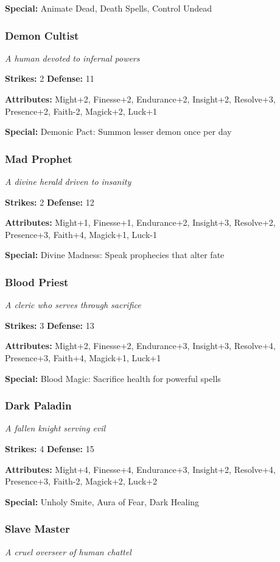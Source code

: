 \documentclass[10pt,twoside]{article}
\begin{document}
\textbf{Special:} Animate Dead, Death Spells, Control Undead

\subsubsection{Demon Cultist}
\textit{A human devoted to infernal powers}

\textbf{Strikes:} 2 \quad \textbf{Defense:} 11

\textbf{Attributes:} Might+2, Finesse+2, Endurance+2, Insight+2, Resolve+3, Presence+2, Faith-2, Magick+2, Luck+1

\textbf{Special:} Demonic Pact: Summon lesser demon once per day

\subsubsection{Mad Prophet}
\textit{A divine herald driven to insanity}

\textbf{Strikes:} 2 \quad \textbf{Defense:} 12

\textbf{Attributes:} Might+1, Finesse+1, Endurance+2, Insight+3, Resolve+2, Presence+3, Faith+4, Magick+1, Luck-1

\textbf{Special:} Divine Madness: Speak prophecies that alter fate

\subsubsection{Blood Priest}
\textit{A cleric who serves through sacrifice}

\textbf{Strikes:} 3 \quad \textbf{Defense:} 13

\textbf{Attributes:} Might+2, Finesse+2, Endurance+3, Insight+3, Resolve+4, Presence+3, Faith+4, Magick+1, Luck+1

\textbf{Special:} Blood Magic: Sacrifice health for powerful spells

\subsubsection{Dark Paladin}
\textit{A fallen knight serving evil}

\textbf{Strikes:} 4 \quad \textbf{Defense:} 15

\textbf{Attributes:} Might+4, Finesse+4, Endurance+3, Insight+2, Resolve+4, Presence+3, Faith-2, Magick+2, Luck+2

\textbf{Special:} Unholy Smite, Aura of Fear, Dark Healing

\subsubsection{Slave Master}
\textit{A cruel overseer of human chattel}
\end{document}
